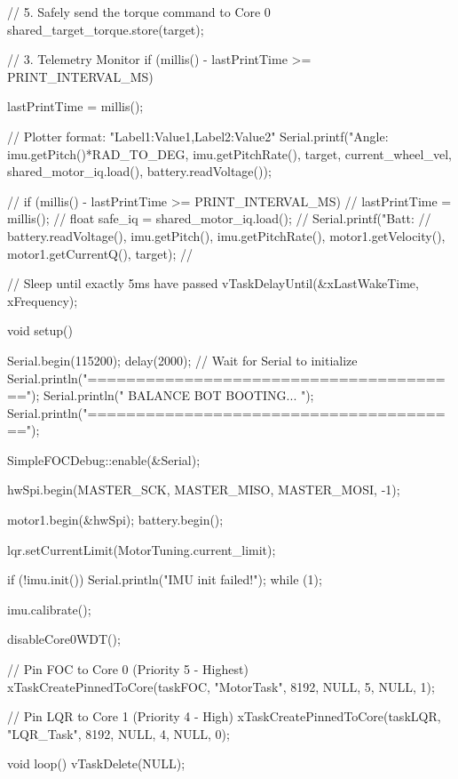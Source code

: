 {{        // 5. Safely send the torque command to Core 0
        shared_target_torque.store(target);

        // 3. Telemetry Monitor
        if (millis() - lastPrintTime >= PRINT_INTERVAL_MS) {
            lastPrintTime = millis();
            
            // Plotter format: "Label1:Value1,Label2:Value2"
            Serial.printf("Angle:%
                          imu.getPitch()*RAD_TO_DEG, 
                          imu.getPitchRate(), target, current_wheel_vel, shared_motor_iq.load(), battery.readVoltage());
        }
        // if (millis() - lastPrintTime >= PRINT_INTERVAL_MS) {
        //     lastPrintTime = millis();
        //     float safe_iq = shared_motor_iq.load();
        //     Serial.printf("Batt: %
        //                   battery.readVoltage(), imu.getPitch(), imu.getPitchRate(), motor1.getVelocity(), motor1.getCurrentQ(), target);
        // }
        
        // Sleep until exactly 5ms have passed
        vTaskDelayUntil(&xLastWakeTime, xFrequency);
    }
}

void setup() {
    Serial.begin(115200);
    delay(2000); // Wait for Serial to initialize
    Serial.println("\n\n=======================================");
    Serial.println("       BALANCE BOT BOOTING...          ");  
    Serial.println("=======================================\n");

    SimpleFOCDebug::enable(&Serial);

    hwSpi.begin(MASTER_SCK, MASTER_MISO, MASTER_MOSI, -1);
    
    motor1.begin(&hwSpi);
    battery.begin();

    lqr.setCurrentLimit(MotorTuning.current_limit);
    
    if (!imu.init()) {
        Serial.println("IMU init failed!");
        while (1);
    }
    
    imu.calibrate();

    disableCore0WDT();

    // Pin FOC to Core 0 (Priority 5 - Highest)
    xTaskCreatePinnedToCore(taskFOC, "MotorTask", 8192, NULL, 5, NULL, 1);
    
    // Pin LQR to Core 1 (Priority 4 - High)
    xTaskCreatePinnedToCore(taskLQR, "LQR_Task", 8192, NULL, 4, NULL, 0);
}

void loop() {
    vTaskDelete(NULL); 
}